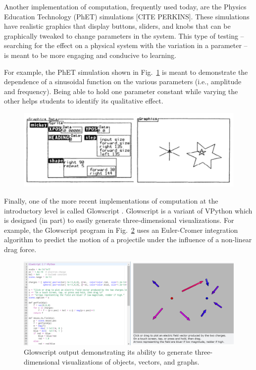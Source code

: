 \documentclass{msuphddissertation}
\begin{document}
\begin{doublespace}
Another implementation of computation, frequently used today, are the Physics Education Technology (PhET) simulations [CITE PERKINS].  These simulations have realistic graphics that display buttons, sliders, and knobs that can be graphically tweaked to change parameters in the system.  This type of testing -- searching for the effect on a physical system with the variation in a parameter -- is meant to be more engaging and conducive to learning.

For example, the PhET simulation shown in Fig.~\ref{CH2:PhET} is meant to demonstrate the dependence of a sinusoidal function on the various parameters (i.e., amplitude and frequency).  Being able to hold one parameter constant while varying the other helps students to identify its qualitative effect.

\begin{figure}
\includegraphics[scale=0.75]{images/CH2BOXER.pdf}
\caption{}\label{CH2:PhET}
\end{figure}

Finally, one of the more recent implementations of computation at the introductory level is called Glowscript \cite{Chabay2008}.  Glowscript is a variant of VPython which is designed (in part) to easily generate three-dimensional visualizations.  For example, the Glowscript program in Fig.~\ref{CH2:Glowscript} uses an Euler-Cromer integration algorithm to predict the motion of a projectile under the influence of a non-linear drag force.  

\begin{figure}\center
\includegraphics[scale=0.35]{images/CH2Glowscript.pdf}
\caption{Glowscript output demonstrating its ability to generate three-dimensional visualizations of objects, vectors, and graphs.}\label{CH2:Glowscript}
\end{figure}


\end{doublespace}
\end{document}
